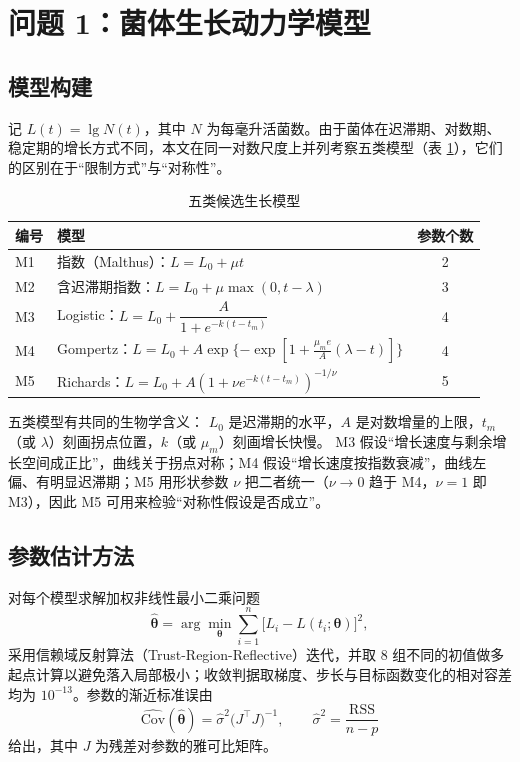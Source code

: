 \section{问题 1：菌体生长动力学模型}

\subsection{模型构建}
记 $L(t)=\lg N(t)$，其中 $N$ 为每毫升活菌数。由于菌体在迟滞期、对数期、稳定期的增长方式不同，本文在同一对数尺度上并列考察五类模型（表 \ref{tab:q1models}），它们的区别在于“限制方式”与“对称性”。

\begin{table}[H]
\centering
\caption{五类候选生长模型}
\label{tab:q1models}
\small
\begin{tabular}{llc}
\toprule
编号 & 模型 & 参数个数 \\
\midrule
M1 & 指数（Malthus）：$L=L_0+\mu t$ & 2 \\
M2 & 含迟滞期指数：$L=L_0+\mu\max(0,t-\lambda)$ & 3 \\
M3 & Logistic：$L=L_0+\dfrac{A}{1+e^{-k(t-t_m)}}$ & 4 \\
M4 & Gompertz：$L=L_0+A\exp\{-\exp[1+\frac{\mu_m e}{A}(\lambda-t)]\}$ & 4 \\
M5 & Richards：$L=L_0+A(1+\nu e^{-k(t-t_m)})^{-1/\nu}$ & 5 \\
\bottomrule
\end{tabular}
\end{table}

五类模型有共同的生物学含义：
$L_0$ 是迟滞期的水平，$A$ 是对数增量的上限，$t_m$（或 $\lambda$）刻画拐点位置，$k$（或 $\mu_m$）刻画增长快慢。
M3 假设“增长速度与剩余增长空间成正比”，曲线关于拐点对称；M4 假设“增长速度按指数衰减”，曲线左偏、有明显迟滞期；M5 用形状参数 $\nu$ 把二者统一（$\nu\to0$ 趋于 M4，$\nu=1$ 即 M3），因此 M5 可用来检验“对称性假设是否成立”。

\subsection{参数估计方法}
对每个模型求解加权非线性最小二乘问题
$$\hat{\boldsymbol\theta}=\arg\min_{\boldsymbol\theta}\sum_{i=1}^{n}\big[L_i-L(t_i;\boldsymbol\theta)\big]^2 ,$$
采用信赖域反射算法（Trust-Region-Reflective）迭代，并取 8 组不同的初值做多起点计算以避免落入局部极小；收敛判据取梯度、步长与目标函数变化的相对容差均为 $10^{-13}$。参数的渐近标准误由
$$\widehat{\mathrm{Cov}}(\hat{\boldsymbol\theta})=\hat\sigma^2\big(J^{\top}J\big)^{-1},\qquad \hat\sigma^2=\frac{\mathrm{RSS}}{n-p}$$
给出，其中 $J$ 为残差对参数的雅可比矩阵。

